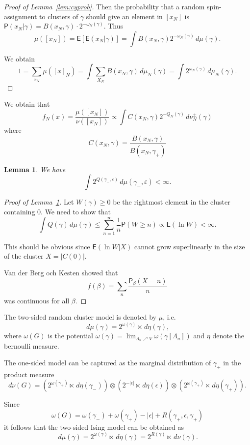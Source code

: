 \documentclass[11pt, a4paper, oneside]{article}
\newtheorem{lemma}[thm]{Lemma}
\theoremstyle{definition}
\theoremstyle{remark}
\renewcommand{\d}{\,d}
\providecommand{\E}{\mathsf{E}}
\renewcommand{\P}{\mathsf{P}}
\providecommand{\e}{\epsilon}
\providecommand{\g}{\gamma}
\providecommand{\w}{\omega}
\def\e{\varepsilon}
\begin{document}
\begin{proof}[Proof of Lemma~\ref{lem:cyprob}]
  Then the probability that a random spin-assignment to clusters of $\g$ should
  give an element in $[x_N]$ is $\P(x_N|\g) = B(x_N,\g)\cdot 2^{-\w_N(\g)}$.
  Thus
  $$
  \mu([x_N]) = \E\left[\E(x_N|\g)\right] = \int B(x_N,\g) 2^{-\w_N(\g)}\d\mu(\g).
  $$

  We obtain
  $$
  1 = \sum_{x_N}\mu([x]_N) = \int \sum_{X_N} B(x_N,\gamma) \d\mu_N(\gamma) = \int 2^{\w_N(\g)} \d\mu_N(\gamma).
  $$
\end{proof}

We obtain that
\[
  f_N(x) = \frac{\mu([x_N])}{\nu([x_N])} \propto \int C(x_N,\g) 2^{-Q_N(\g)}\d\nu_N^{\pm}(\g)
\]
where
\[
  C(x_N,\g) = \frac{B(x_N,\g)}{B(x_N,\g_+)}
\]


\begin{lemma}\label{lem:Qintegrable}
  We have
  \[
    \int 2^{Q(\g_-,\e)} \d\mu(\g_-,\e) < \infty.
  \]
\end{lemma}
\begin{proof}[Proof of Lemma~\ref{lem:Qintegrable}]

  Let $W(\g)\ge 0$ be the rightmost element in the cluster containing $0$. We
  need to show that
  \[
    \int Q(\g) \d\mu(\g) \le \sum_{n=1}^\infty \frac 1n \P(W\ge n) \propto \E(\ln W ) < \infty.
  \]

  This should be obvious since $\E(\ln W|X)$ cannot grow superlinearly in the
  size of the cluster $X=|C(0)|$.

  Van der Berg och Kesten showed that
  \[
    f(\beta) = \sum_{n} \frac{\P_\beta(X=n)}{n}
  \]
  was continuous for all $\beta$.

\end{proof}






The two-sided random cluster model is denoted by $\mu$, i.e.\
$$ \d\mu(\g) = 2^{\w(\g)} \ltimes \d\eta(\g), $$
where $\w(G)$ is the potential
$\w(\g) = \lim_{\Lambda_n\nearrow V} \w(\g[\Lambda_n])$ and $\eta$ denote the
bernoulli measure.

The one-sided model can be captured as the marginal distribution of $\gamma_+$
in the product measure
\[
  d\nu(G) = (2^{\w(\g_+)} \ltimes \d\eta(\gamma_-)) \otimes (2^{-|\epsilon|} \ltimes \d\eta(\epsilon)) \otimes (2^{\w(\g_+)} \ltimes \d\eta(\g_+)).
\]

Since
\[
  \w(G) = \w(\g_-) + \w(\g_+) - |\epsilon| + R(\g_+,\epsilon,\g_+)
\]
it follows that the two-sided Ising model can be obtained as
\[
  \d\mu(\g) = 2^{\w(\g)} \ltimes \d\eta(\g) = 2^{R(\g)} \ltimes \d\nu(\g).
\]
\end{document}
